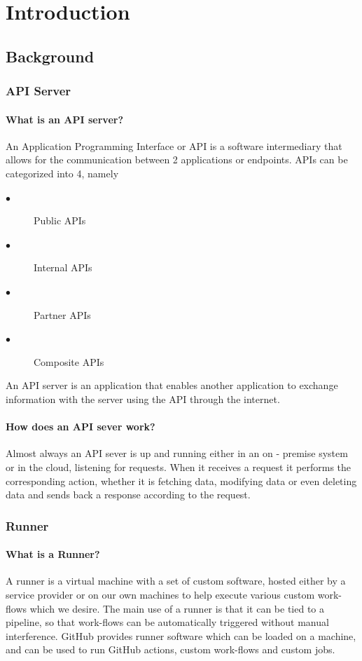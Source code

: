 \chapter{Introduction} 
\label{Chapter 1} 



\section{Background}
\subsection{API Server}
\subsubsection{What is an API server?}
An Application Programming Interface or API is a software intermediary that allows for the communication between 2 applications or endpoints. APIs can be categorized into 4, namely 
\begin{description}
\item[$\bullet$] Public APIs
\item[$\bullet$] Internal APIs
\item[$\bullet$] Partner APIs
\item[$\bullet$] Composite APIs
\end{description}


An API server is an application that enables another application to exchange information with the server using the API through the internet.
\subsubsection{How does an API sever work?}
Almost always an API sever is up and running either in an on - premise system or in the cloud, listening for requests. When it receives a request it performs the corresponding action, whether it is fetching data, modifying data or even deleting data and sends back a response according to the request.
\subsection{Runner}
\subsubsection{What is a Runner?}
A runner is a virtual machine with a set of custom software, hosted either by a service provider or on our own machines to help execute various custom work-flows which we desire. The main use of a runner is that it can be tied to a pipeline, so that work-flows can be automatically triggered without manual interference. GitHub provides runner software which can be loaded on a machine, and can be used to run GitHub actions, custom work-flows and custom jobs. 
